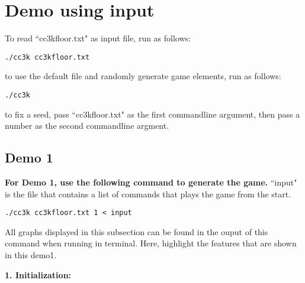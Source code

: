 \documentclass[11pt]{article}
\theoremstyle{plain}
\begin{document}
\newpage
\section{ Demo using input }

To read ``cc3kfloor.txt" as input file, run as follows:
\begin{lstlisting}
./cc3k cc3kfloor.txt
\end{lstlisting}
to use the default file and randomly generate game elements, run as follows:
\begin{lstlisting}
./cc3k
\end{lstlisting}
to fix a seed, pass ``cc3kfloor.txt" as the first commandline argument,
then pass a number as the second commandline argment. 

\subsection{Demo 1}
\textbf{For Demo 1, use the following command to generate the game.} ``input"
is the file that contains a list of commands that plays the game from the
start.
\begin{lstlisting}
./cc3k cc3kfloor.txt 1 < input
\end{lstlisting}
All graphs displayed in this subsection can be found in the ouput of
this command when running in terminal. Here, highlight the features that
are shown in this demo1.

\textbf{1. Initialization:}
\end{document}
